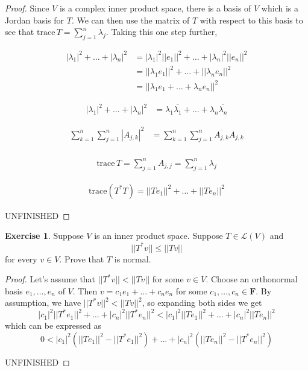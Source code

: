 \documentclass{article}
\theoremstyle{definition}
\newtheorem{ex}{Exercise}
\begin{document}
\begin{proof}
	Since $V$ is a complex inner product space, there is a basis of $V$ which is a Jordan basis for $T$.
	We can then use the matrix of $T$ with respect to this basis to see that $\mathrm{trace}\,T = \sum _{j = 1}^{n} \lambda_j$.
  Taking this one step further, 

	\begin{align*}
		|\lambda_1|^2 + \dots + |\lambda_n|^2 & = |\lambda_1|^2||e_1||^2 + \dots + |\lambda_n|^2||e_n||^2 \\
		                                      & = ||\lambda_1 e_1||^2 + \dots + ||\lambda_n e_n||^2       \\
		                                      & = ||\lambda_1 e_1 + \dots + \lambda_n e_n||^2
	\end{align*}

  \begin{align*}
    |\lambda_1|^2 + \dots + |\lambda_n|^2 & = \lambda_1 \overline{\lambda_1} + \dots + \lambda_n\overline{\lambda_n}
  \end{align*}

	\begin{align*}
		\sum _{k = 1}^{n} \sum _{j = 1}^{n}|A_{j, k}|^2 & = \sum _{k = 1}^{n} \sum _{j = 1}^{n}\overline{A_{j, k}}A_{j, k} \\
	\end{align*}

  \begin{align*}
    \mathrm{trace}\,T = \sum _{j = 1}^{n}A_{j, j} = \sum _{j = 1}^{n} \lambda_j
  \end{align*}

  \begin{align*}
    \mathrm{trace}(T^*T) = ||Te_1||^2 + \dots + ||Te_n||^2
  \end{align*}

  UNFINISHED
\end{proof}

\begin{ex}
  Suppose $V$ is an inner product space.
  Suppose $T \in \mathcal{L}(V)$ and \begin{equation*}
    ||T^*v|| \leq ||Tv||
  \end{equation*}
  for every $v \in V$.
  Prove that $T$ is normal.
\end{ex}
\begin{proof}
  Let's assume that $||T^*v|| < ||Tv||$ for some $v \in V$.
  Choose an orthonormal basis $e_1, \dots, e_n$ of $V$.
  Then $v = c_1e_1 + \dots + c_ne_n$ for some $c_1, \dots, c_n \in \mathbf{F}$.
  By assumption, we have $||T^*v||^2 < ||Tv||^2$, so expanding both sides we get \begin{equation*}
    |c_1|^2||T^*e_1||^2 + \dots + |c_n|^2||T^*e_n||^2 < |c_1|^2||Te_1||^2 + \dots + |c_n|^2||Te_n||^2
  \end{equation*}
  which can be expressed as \begin{equation*}
    0 < |c_1|^2(||Te_1||^2 - ||T^*e_1||^2) + \dots + |c_n|^2(||Te_n||^2 - ||T^*e_n||^2)
  \end{equation*}

  UNFINISHED
\end{proof}
\end{document}
